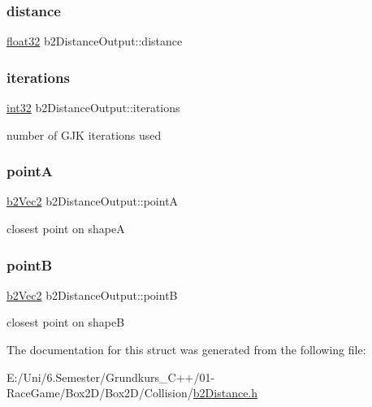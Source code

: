 \subsubsection{\texorpdfstring{distance}{distance}}
{\footnotesize\ttfamily \mbox{\hyperlink{b2_settings_8h_aacdc525d6f7bddb3ae95d5c311bd06a1}{float32}} b2\+Distance\+Output\+::distance}

\mbox{\label{structb2_distance_output_ae2d4c84dd3d05ea4f4d20c91099ec8d5}} 
\subsubsection{\texorpdfstring{iterations}{iterations}}
{\footnotesize\ttfamily \mbox{\hyperlink{b2_settings_8h_a43d43196463bde49cb067f5c20ab8481}{int32}} b2\+Distance\+Output\+::iterations}



number of G\+JK iterations used 

\mbox{\label{structb2_distance_output_a7e0f1f44a64e596dc7d37570c69eefce}} 
\subsubsection{\texorpdfstring{pointA}{pointA}}
{\footnotesize\ttfamily \mbox{\hyperlink{structb2_vec2}{b2\+Vec2}} b2\+Distance\+Output\+::pointA}



closest point on shapeA 

\mbox{\label{structb2_distance_output_aa85beca17337a506cd4a924d0c6f92cc}} 
\subsubsection{\texorpdfstring{pointB}{pointB}}
{\footnotesize\ttfamily \mbox{\hyperlink{structb2_vec2}{b2\+Vec2}} b2\+Distance\+Output\+::pointB}



closest point on shapeB 



The documentation for this struct was generated from the following file\+:\begin{DoxyCompactItemize}
\item 
E\+:/\+Uni/6.\+Semester/\+Grundkurs\+\_\+\+C++/01-\/\+Race\+Game/\+Box2\+D/\+Box2\+D/\+Collision/\mbox{\hyperlink{b2_distance_8h}{b2\+Distance.\+h}}\end{DoxyCompactItemize}
